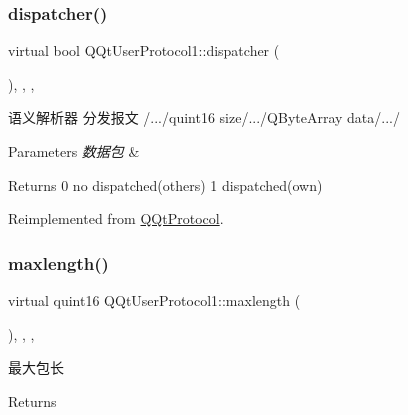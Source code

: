 \subsubsection{\texorpdfstring{dispatcher()}{dispatcher()}}
{\footnotesize\ttfamily virtual bool Q\+Qt\+User\+Protocol1\+::dispatcher (\begin{DoxyParamCaption}\item[{const Q\+Byte\+Array \&}]{ }\end{DoxyParamCaption})\hspace{0.3cm}{\ttfamily [inline]}, {\ttfamily [override]}, {\ttfamily [protected]}, {\ttfamily [virtual]}}



语义解析器 分发报文 /.../quint16 size/.../\+Q\+Byte\+Array data/.../ 


\begin{DoxyParams}{Parameters}
{\em 数据包} & \\
\hline
\end{DoxyParams}
\begin{DoxyReturn}{Returns}
0 no dispatched(others) 1 dispatched(own) 
\end{DoxyReturn}


Reimplemented from \mbox{\hyperlink{class_q_qt_protocol_a35a69c4b89c8cf7459038f40d75e0dc9}{Q\+Qt\+Protocol}}.

\mbox{\label{class_q_qt_user_protocol1_ab66c2cd59e9f2a79d3bc3e2197b51870}} 
\subsubsection{\texorpdfstring{maxlength()}{maxlength()}}
{\footnotesize\ttfamily virtual quint16 Q\+Qt\+User\+Protocol1\+::maxlength (\begin{DoxyParamCaption}{ }\end{DoxyParamCaption})\hspace{0.3cm}{\ttfamily [inline]}, {\ttfamily [override]}, {\ttfamily [protected]}, {\ttfamily [virtual]}}



最大包长 

\begin{DoxyReturn}{Returns}

\end{DoxyReturn}



